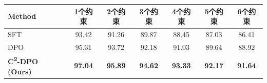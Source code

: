 \begin{table}[H]
\centering
{}
\footnotesize
\label{tab:method3-density-res}
\begin{tabular}{lcccccc}
\toprule
\textbf{Method} & \textbf{1个约束} & \textbf{2个约束} & \textbf{3个约束} & \textbf{4个约束} & \textbf{5个约束} & \textbf{6个约束} \\
\midrule
SFT & 93.42 & 91.26 & 89.87 & 88.45 & 87.03 & 86.41 \\
DPO & 95.31 & 93.72 & 92.18 & 91.03 & 89.64 & 88.92 \\
\textbf{C\textsuperscript{2}-DPO (Ours)} & \textbf{97.04} & \textbf{95.89} & \textbf{94.62} & \textbf{93.33} & \textbf{92.17} & \textbf{91.64} \\
\bottomrule
\end{tabular}
\end{table}
